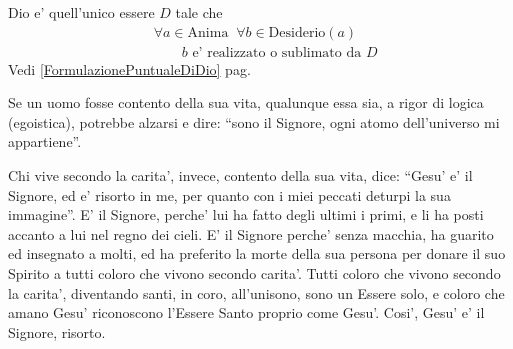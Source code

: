 \begin{vcentered}
Dio e' quell'unico essere $D$ tale che
    \begin{align*}
        &\forall a \in \textrm{Anima}\;\;\forall b \in \textrm{Desiderio}(a)\;\;\\
        &\quad\quad b\textrm{ e' realizzato o sublimato da }D
    \end{align*}
    Vedi \ref{FormulazionePuntualeDiDio} pag. \pageref{FormulazionePuntualeDiDio}
\end{vcentered}

\begin{vcentered}
    Se un uomo fosse contento della sua vita, qualunque essa sia, a rigor di logica (egoistica), potrebbe alzarsi e dire: ``sono il Signore, ogni atomo dell'universo mi appartiene''. 

    Chi vive secondo la carita', invece, contento della sua vita, dice: ``Gesu' e' il Signore, ed e' risorto in me, per quanto con i miei peccati deturpi la sua immagine''. E' il Signore, perche' lui ha fatto degli ultimi i primi, e li ha posti accanto a lui nel regno dei cieli. E' il Signore perche' senza macchia, ha guarito ed insegnato a molti, ed ha preferito la morte della sua persona per donare il suo Spirito a tutti coloro che vivono secondo carita'. Tutti coloro che vivono secondo la carita', diventando santi, in coro, all'unisono, sono un Essere solo, e coloro che amano Gesu' riconoscono l'Essere Santo proprio come Gesu'. Cosi', Gesu' e' il Signore, risorto.
\end{vcentered}


